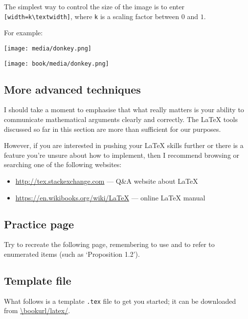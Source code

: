 The simplest way to control the size of the image is to enter \lstinline|[width=k\textwidth]|, where \lstinline|k| is a scaling factor between $0$ and $1$.

For example:

\begin{texcodeleft}[1]
\begin{center}
\texttt{[image: media/donkey.png]}
\end{center}
\end{texcodeleft}

\begin{texcoderight}[1]
\begin{center}
\texttt{[image: book/media/donkey.png]}
\end{center}
\end{texcoderight}

\subsection*{More advanced techniques}
I should take a moment to emphasise that what really matters is your ability to communicate mathematical arguments clearly and correctly. The \LaTeX{} tools discussed so far in this section are more than sufficient for our purposes.

However, if you are interested in pushing your \LaTeX{} skills further or there is a feature you're unsure about how to implement, then I recommend browsing or searching one of the following websites:
\begin{itemize}
\item \url{http://tex.stackexchange.com} --- Q\&A website about \LaTeX{}
\item \url{https://en.wikibooks.org/wiki/LaTeX} --- online \LaTeX{} manual
\end{itemize}

\newpage
\subsection*{Practice page}
Try to recreate the following page, remembering to use  and  to refer to enumerated items (such as `Proposition 1.2').

\vspace{-10pt}
\begin{center}
\end{center}

\newpage
\subsection*{Template file}
\label{pTeXTemplate}

What follows is a template \texttt{.tex} file to get you started; it can be downloaded from \url{\bookurl/latex/}.

